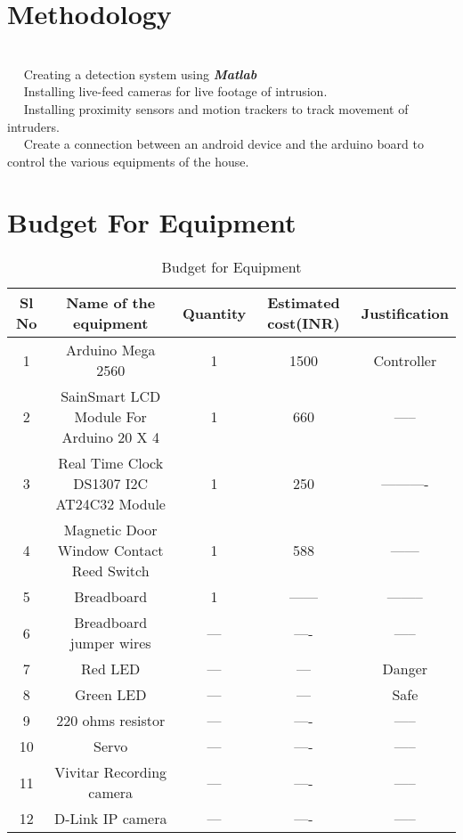\documentclass[margin, centered]{res}
\begin{document}
\begin{resume}
\section{Methodology}
\hspace{5mm} \\
~\textbullet~ Creating a detection system using \textbf{\textit{Matlab}}\\
~\textbullet~ Installing live-feed cameras for live footage of intrusion.\\
~\textbullet~ Installing proximity sensors and motion trackers to track movement of intruders.\\
~\textbullet~ Create a connection between an android device and the arduino board to control the various equipments of the house.


\section{Budget For Equipment}
\begin{table}[ht]
\caption{Budget for Equipment}
\begin{tabular}{c c c c c}
\hline \hline
Sl No & Name of the equipment & Quantity & Estimated cost(INR) & Justification\\
\hline

1 & Arduino Mega 2560 & 1 & 1500 & Controller\\
2 & SainSmart LCD Module For Arduino 20 X 4 & 1 & 660 & -----\\
3 & Real Time Clock DS1307 I2C AT24C32 Module & 1 & 250 & ----------\\
4 & Magnetic Door Window Contact Reed Switch & 1 & 588 & ------ \\
5 & Breadboard & 1 & ------ & --------\\
6 & Breadboard jumper wires & --- & ---- & -----\\
7 & Red LED & --- & --- & Danger\\
8 & Green LED & --- & --- & Safe\\
9 & 220 ohms resistor & --- & ---- & -----\\
10 & Servo & --- & ---- & -----\\
11 & Vivitar Recording camera & --- & ---- & -----\\
12 & D-Link IP camera & --- & ---- & -----\\



\end{tabular}
\end{table}
\end{resume}
\end{document}
